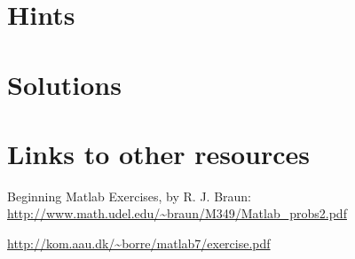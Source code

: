\documentclass[12pt,a4paper]{article}
\newcounter{ex}
\numberwithin{ex}{section}
\begin{document}


\newpage
\section{Hints}



\newpage
\section{Solutions}



\newpage
\section{Links to other resources}

Beginning Matlab Exercises, by R. J. Braun: 
\url{http://www.math.udel.edu/~braun/M349/Matlab_probs2.pdf}

\url{http://kom.aau.dk/~borre/matlab7/exercise.pdf}
\end{document}
